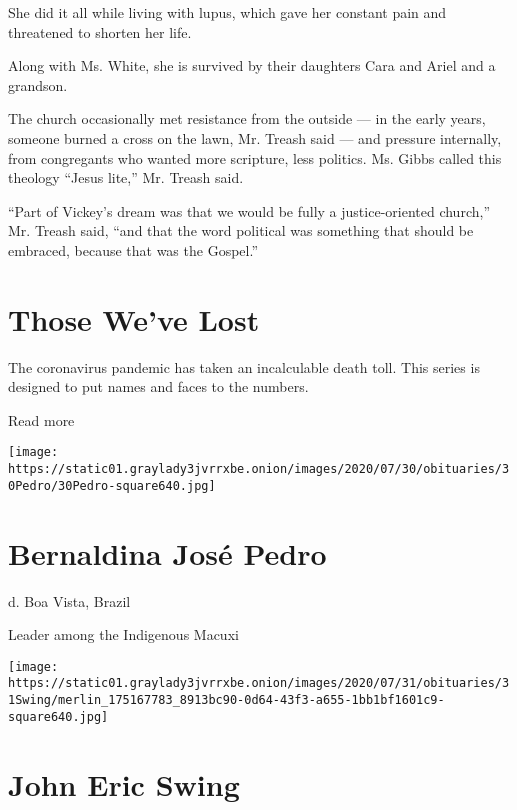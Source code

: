 She did it all while living with lupus, which gave her constant pain and
threatened to shorten her life.

Along with Ms. White, she is survived by their daughters Cara and Ariel
and a grandson.

The church occasionally met resistance from the outside --- in the early
years, someone burned a cross on the lawn, Mr. Treash said --- and
pressure internally, from congregants who wanted more scripture, less
politics. Ms. Gibbs called this theology ``Jesus lite,'' Mr. Treash
said.

``Part of Vickey's dream was that we would be fully a justice-oriented
church,'' Mr. Treash said, ``and that the word political was something
that should be embraced, because that was the Gospel.''

\href{https://www.nytimes3xbfgragh.onion/interactive/2020/obituaries/people-died-coronavirus-obituaries.html?action=click\&pgtype=Article\&state=default\&region=BELOW_MAIN_CONTENT\&context=covid_obits_promo}{}

\hypertarget{those-weve-lost}{%
\section{Those We've Lost}\label{those-weve-lost}}

The coronavirus pandemic has taken an incalculable death toll. This
series is designed to put names and faces to the numbers.

Read more

\texttt{[image: https://static01.graylady3jvrrxbe.onion/images/2020/07/30/obituaries/30Pedro/30Pedro-square640.jpg]}

\hypertarget{bernaldina-josuxe9-pedro}{%
\section{Bernaldina José Pedro}\label{bernaldina-josuxe9-pedro}}

d. Boa Vista, Brazil

Leader among the Indigenous Macuxi

\texttt{[image: https://static01.graylady3jvrrxbe.onion/images/2020/07/31/obituaries/31Swing/merlin\_175167783\_8913bc90-0d64-43f3-a655-1bb1bf1601c9-square640.jpg]}

\hypertarget{john-eric-swing}{%
\section{John Eric Swing}\label{john-eric-swing}}

